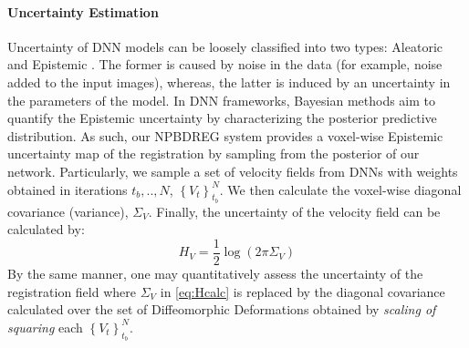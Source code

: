 \documentclass[preprint,authoryear]{elsarticle}
\begin{document}
\paragraph{Uncertainty Estimation}
Uncertainty of DNN models can be loosely classified into two types: Aleatoric and Epistemic \cite{kendall2017uncertainties}. The former is caused by noise in the data (for example, noise added to the input images), whereas, the latter is induced by an uncertainty in the parameters of the model. In DNN frameworks, Bayesian methods aim to quantify the Epistemic uncertainty by characterizing the posterior predictive distribution. As such, our NPBDREG system provides a voxel-wise Epistemic uncertainty map of the registration by sampling from the posterior of our network. Particularly, we sample a set of velocity fields from DNNs with weights obtained in iterations $t_b,..,N$, $\left\{ V_{t}\right\} _{t_{b}}^{N}$. We then calculate the voxel-wise diagonal covariance (variance), $\Sigma_{V}$. Finally, the uncertainty of the velocity field can be calculated by:
\begin{equation}
    H_{V} = \frac{1}{2}\log(2\pi\Sigma_{V}) \label{eq:Hcalc}
\end{equation}
By the same manner, one may quantitatively assess the uncertainty of the registration field where $\Sigma_{V}$ in \eqref{eq:Hcalc} is replaced by the diagonal covariance calculated over the set of Diffeomorphic Deformations obtained by \textit{scaling of squaring} each $\left\{ V_{t}\right\} _{t_{b}}^{N}$.
\end{document}
